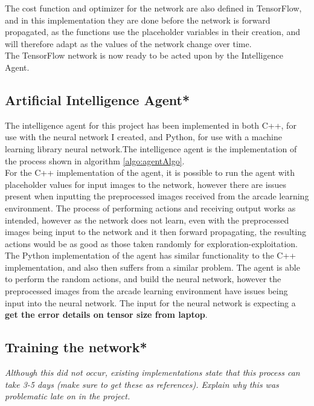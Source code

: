 \documentclass[10pt]{article}
\begin{document}
		The cost function and optimizer for the network are also defined in TensorFlow, and in this implementation they are done before the network is forward propagated, as the functions use the placeholder variables in their creation, and will therefore adapt as the values of the network change over time.\\
		
		The TensorFlow network is now ready to be acted upon by the Intelligence Agent.
		
	\medskip
	
	\subsection{Artificial Intelligence Agent*}
		The intelligence agent for this project has been implemented in both C++, for use with the neural network I created, and Python, for use with a machine learning library neural network.The intelligence agent is the implementation of the process shown in algorithm \ref{algo:agentAlgo}.\\
		
		For the C++ implementation of the agent, it is possible to run the agent with placeholder values for input images to the network, however there are issues present when inputting the preprocessed images received from the arcade learning environment. The process of performing actions and receiving output works as intended, however as the network does not learn, even with the preprocessed images being input to the network and it then forward propagating, the resulting actions would be as good as those taken randomly for exploration-exploitation.\\
		
		The Python implementation of the agent has similar functionality to the C++ implementation, and also then suffers from a similar problem. The agent is able to perform the random actions, and build the neural network, however the preprocessed images from the arcade learning environment have issues being input into the neural network. The input for the neural network is expecting a \textbf{get the error details on tensor size from laptop}.
	\medskip	
	
	
	\subsection{Training the network*}
		\textit{Although this did not occur, existing implementations state that this process can take 3-5 days (make sure to get these as references). Explain why this was problematic late on in the project.}
\end{document}
